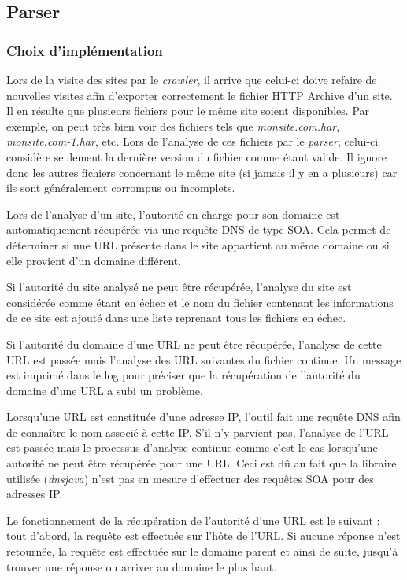 \subsection{Parser}
\label{parser}
\subsubsection{Choix d'implémentation}
Lors de la visite des sites par le \textit{crawler}, il arrive que celui-ci doive refaire de nouvelles visites afin d'exporter correctement le fichier HTTP Archive d'un site. Il en résulte que plusieurs fichiers pour le même site soient disponibles. Par exemple, on peut très bien voir des fichiers tels que \textit{monsite.com.har}, \textit{monsite.com-1.har}, etc. Lors de l'analyse de ces fichiers par le \textit{parser}, celui-ci considère seulement la dernière version du fichier comme étant valide. Il ignore donc les autres fichiers concernant le même site (si jamais il y en a plusieurs) car ils sont généralement corrompus ou incomplets.
\newline

Lors de l'analyse d'un site, l'autorité en charge pour son domaine est automatiquement récupérée via une requête DNS de type SOA. Cela permet de déterminer si une URL présente dans le site appartient au même domaine ou si elle provient d'un domaine différent.

Si l'autorité du site analysé ne peut être récupérée, l'analyse du site est considérée comme étant en échec et le nom du fichier contenant les informations de ce site est ajouté dans une liste reprenant tous les fichiers en échec.

Si l'autorité du domaine d'une URL ne peut être récupérée, l'analyse de cette URL est passée mais l'analyse des URL suivantes du fichier continue. Un message est imprimé dans le log pour préciser que la récupération de l'autorité du domaine d'une URL a subi un problème.

Lorsqu'une URL est constituée d'une adresse IP, l'outil fait une requête DNS afin de connaître le nom associé à cette IP. S'il n'y parvient pas, l'analyse de l'URL est passée mais le processus d'analyse continue comme c'est le cas lorsqu'une autorité ne peut être récupérée pour une URL. Ceci est dû au fait que la libraire utilisée (\textit{dnsjava}) n'est pas en mesure d'effectuer des requêtes SOA pour des adresses IP.

Le fonctionnement de la récupération de l'autorité d'une URL est le suivant : tout d'abord, la requête est effectuée sur l'hôte de l'URL. Si aucune réponse n'est retournée, la requête est effectuée sur le domaine parent et ainsi de suite, jusqu'à trouver une réponse ou arriver au domaine le plus haut.

